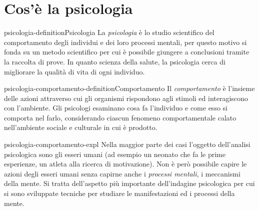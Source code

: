 \documentclass[preview]{standalone}
\begin{document}
\genpage

\section{Cos'è la psicologia}

\begin{snippetdefinition}{psicologia-definition}{Psicologia}
    La \emph{psicologia} è lo studio scientifico del comportamento degli individui e dei loro processi
    mentali, per questo motivo si fonda su un metodo scientifico per cui è possibile giungere a
    conclusioni tramite la raccolta di prove. In quanto scienza della salute, la psicologia cerca di
    migliorare la qualità di vita di ogni individuo.
\end{snippetdefinition}

\begin{snippetdefinition}{psicologia-comportamento-definition}{Comportamento}
    Il \emph{comportamento} è l'insieme delle azioni attraverso cui gli organismi rispondono agli stimoli ed
    interagiscono con l'ambiente. Gli psicologi esaminano cosa fa l'individuo e come esso si comporta
    nel farlo, considerando ciascun fenomeno comportamentale calato nell'ambiente sociale e culturale
    in cui è prodotto.
\end{snippetdefinition}

\begin{snippet}{psicologia-comportamento-expl}
    Nella maggior parte dei casi l'oggetto dell'analisi psicologica sono gli esseri umani (ad esempio un
    neonato che fa le prime esperienze, un atleta alla ricerca di motivazione). Non è però possibile
    capire le azioni degli esseri umani senza capirne anche i \emph{processi mentali}, i meccanismi della
    mente. Si tratta dell'aspetto più importante dell'indagine psicologica per cui si sono sviluppate
    tecniche per studiare le manifestazioni ed i processi della mente.
\end{snippet}
\end{document}
